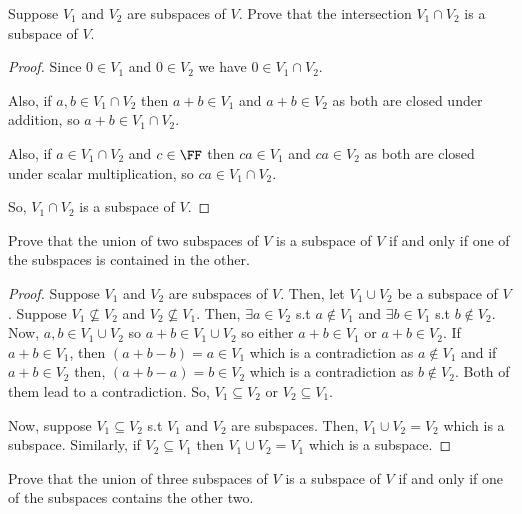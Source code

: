 \begin{exercise}
Suppose $V_1$ and $V_2$ are subspaces of $V$. Prove that the intersection $V_1 \cap V_2$ is a subspace of $V$.
\end{exercise}

\begin{proof}
Since $0 \in V_1$ and $0 \in V_2$ we have $0 \in V_1 \cap V_2$.

Also, if $a, b \in V_1 \cap V_2$ then $a+b \in V_1$ and $a+b \in V_2$ as both are closed under addition, so $a+b \in V_1 \cap V_2$.

Also, if $a \in V_1 \cap V_2$ and $c \in \FF$ then $ca \in V_1$ and $ca \in V_2$ as both are closed under scalar multiplication, so $ca \in V_1 \cap V_2$.

So, $V_1 \cap V_2$ is a subspace of $V$.
\end{proof}


\begin{exercise}
\label{exp:1.11}
Prove that the union of two subspaces of $V$ is a subspace of $V$ if and only if one of the subspaces is contained in the other.
\end{exercise}

\begin{proof}
Suppose $V_1$ and $V_2$ are subspaces of $V$. Then, let $V_1 \cup V_2$ be a subspace of $V$. Suppose $V_1 \not\subseteq V_2$ and $V_2 \not\subseteq V_1$. Then, $\exists a \in V_2$ s.t $a \notin V_1$ and $\exists b \in V_1$ s.t $b \notin V_2$. Now, $a, b \in V_1 \cup V_2$ so $a + b \in V_1 \cup V_2$ so either $a+b \in V_1$ or $a+b \in V_2$. If $a+b \in V_1$, then $(a+b-b) = a \in V_1$ which is a contradiction as $a \notin V_1$ and if $a+b \in V_2$ then, $(a+b-a) = b \in V_2$ which is a contradiction as $b \notin V_2$. Both of them lead to a contradiction. So, $V_1 \subseteq V_2$ or $V_2 \subseteq V_1$.

Now, suppose $V_1 \subseteq V_2$ s.t $V_1$ and $V_2$ are subspaces. Then, $V_1 \cup V_2 = V_2$ which is a subspace. Similarly, if $V_2 \subseteq V_1$ then $V_1 \cup V_2 = V_1$ which is a subspace.
\end{proof}

\begin{exercise}
Prove that the union of three subspaces of $V$ is a subspace of $V$ if and only if one of the subspaces contains the other two.
\end{exercise}

